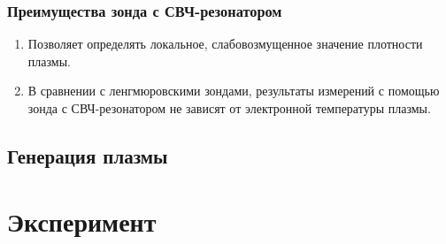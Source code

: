 \documentclass[10pt,pdf,hyperref={unicode}, dvipsnames]{beamer}
\begin{document}
\begin{frame}
	\frametitle{Преимущества зонда с СВЧ-резонатором}
	\begin{enumerate}
		\item Позволяет определять локальное, слабовозмущенное значение плотности плазмы. 
		\item В сравнении с ленгмюровскими зондами, результаты измерений с помощью зонда с СВЧ-резонатором не зависят от электронной температуры плазмы. %

	\end{enumerate}
\end{frame}
    


\subsection{Генерация плазмы}
\section{Эксперимент}
\end{document}
